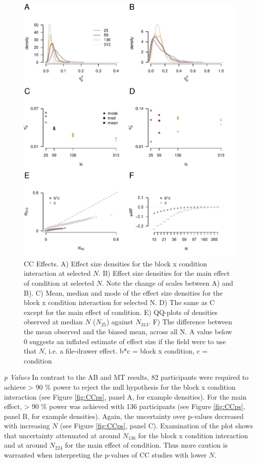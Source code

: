 \documentclass{article}
\begin{document}
\begin{figure}

{\centering \includegraphics[width=0.8\linewidth]{../images/IMMCC_fx_main} 

}

\caption{CC Effects. A) Effect size densities for the block x condition interaction at selected $N$. B) Effect size densities for the main effect of condition at selected $N$. Note the change of scales between A) and B). C) Mean, median and mode of the effect size densities for the block x condition interaction for selected N. D) The same as C except for the main effect of condition. E) QQ-plots of densities observed at median $N$ ($N_{25}$) against $N_{313}$. F) The difference between the mean observed and the biased mean, across all N. A value below 0 suggests an inflated estimate of effect size if the field were to use that $N$, i.e. a file-drawer effect. b*c = block x condition, c = condition}\label{fig:CCFX}
\end{figure}

\emph{p Values} In contrast to the AB and MT results, 82 participants were required to achieve \textgreater{} 90 \% power to reject the null hypothesis for the block x condition interaction (see Figure \ref{fig:CCps}, panel A, for example densities). For the main effect, \textgreater{} 90 \% power was achieved with 136 participants (see Figure \ref{fig:CCps}, panel B, for example densities). Again, the uncertainty over p-values decreased with increasing \(N\) (see Figure \ref{fig:CCps}, panel C). Examination of the plot shows that uncertainty attenuated at around \(N_{136}\) for the block x condition interaction and at around \(N_{224}\) for the main effect of condition. Thus more caution is warranted when interpreting the p-values of CC studies with lower \(N\).
\end{document}

